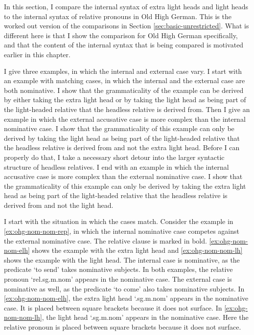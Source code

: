 In this section, I compare the internal syntax of extra light heads and light heads to the internal syntax of relative pronouns in Old High German. This is the worked out version of the comparisons in Section \ref{sec:basic-unrestricted}. What is different here is that I show the comparison for Old High German specifically, and that the content of the internal syntax that is being compared is motivated earlier in this chapter.

I give three examples, in which the internal and external case vary.
I start with an example with matching cases, in which the internal and the external case are both nominative. I show that the grammaticality of the example can be derived by either taking the extra light head or by taking the light head as being part of the light-headed relative that the headless relative is derived from.
Then I give an example in which the external accusative case is more complex than the internal nominative case. I show that the grammaticality of this example can only be derived by taking the light head as being part of the light-headed relative that the headless relative is derived from and not the extra light head. Before I can properly do that, I take a necessary short detour into the larger syntactic structure of headless relatives.
I end with an example in which the internal accusative case is more complex than the external nominative case. I show that the grammaticality of this example can only be derived by taking the extra light head as being part of the light-headed relative that the headless relative is derived from and not the light head.

I start with the situation in which the cases match.
Consider the example in \ref{ex:ohg-nom-nom-rep}, in which the internal nominative case competes against the external nominative case. The relative clause is marked in bold. \ref{ex:ohg-nom-nom-elh} shows the example with the extra light head and \ref{ex:ohg-nom-nom-lh} shows the example with the light head.
The internal case is nominative, as the predicate  `to send' takes nominative subjects.
In both examples, the relative pronoun  `\ac{rel}.\ac{sg}.\ac{m}.\ac{nom}' appears in the nominative case.
The external case is nominative as well, as the predicate  `to come' also takes nominative subjects.
In \ref{ex:ohg-nom-nom-elh}, the extra light head  `.\ac{sg}.\ac{m}.\ac{nom}' appears in the nominative case. It is placed between square brackets because it does not surface.
In \ref{ex:ohg-nom-nom-lh}, the light head  `.\ac{sg}.\ac{m}.\ac{nom}' appears in the nominative case. Here the relative pronoun is placed between square brackets because it does not surface.

